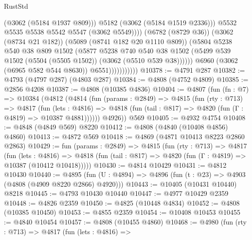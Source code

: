 \begin{lexlean}{RustStd}
\begin{coremodule}
                                      (@3062 (@5184 @1937 @809)))
                                    @5182
                                    (@3062 (@5184 @1519 @2336)))
                                  @5532
                                  @5535
                                  @5538
                                  @5542
                                  @5547
                                  (@3062 @5549))))
                            (@6782 (@8729 @36))
                            (@3062 (@8734 @21 @182))
                            (@5089 (@8741 @182 @20 @1110 @809))
                            (@5804
                              @5238
                              @540
                              @38
                              @809
                              @1502
                              (@5877
                                @5238
                                @740
                                @540
                                @38
                                @1502
                                (@5499 @539 @1502 (@5504 (@5505 @1502)) (@3062 (@5510 @539 @38))))))
                          @6960
                          (@3062 (@6965 @582 @544 @8630))
                          @6551)))))))))))
@10378 := @4791 @287
@10382 := @4793 (@4797 @287) (@4803 @287)
@10384 := @4808 (@4752 @4809)
@10385 := @2856 @4208
@10387 := @4808 (@10385 @4836)
@10404 := @4807
    (fun (fn : @7) =>
    @10384
      (@4812
        (@4814
          (fun (params : @2849) =>
          @4815
            (fun (rty : @713) =>
            @4817
              (fun (lets : @4816) =>
              @4818 (fun (tail : @817) => @4820 (fun (Γ : @4819) => @10387 @4881))))))
        @4926))
    @569
@10405 := @4932 @4754
@10408 := @4848 (@4849 @569) @8220
@10412 := @4808 (@4840 (@10408 @4856) @4860)
@10413 := @4872 @569
@10418 := @4869 (@4871 @10413 @8223 @2860 @2863)
@10429 := fun (params : @2849) =>
  @4815
    (fun (rty : @713) =>
    @4817
      (fun (lets : @4816) =>
      @4818 (fun (tail : @817) => @4820 (fun (Γ : @4819) => @10387 (@10412 @10418)))))
@10430 := @4814 @10429
@10431 := @4812 @10430
@10440 := @4895
    (fun (U : @4894) => @4896 (fun (t : @23) => @4903 (@4808 (@4909 @8220 @2866) @4920)))
@10443 := @10405 (@10431 @10440) @8218
@10445 := @4793 @10430 @10440
@10447 := @4977 @10429 @2359
@10448 := @4826 @2359
@10450 := @4825 (@10448 @4834)
@10452 := @4808 (@10385 @10450)
@10453 := @4855 @2359
@10454 := @10408 @10453
@10455 := @4840 @10454
@10457 := @4808 (@10455 @4860)
@10468 := @4980
    (fun (rty : @713) =>
    @4817
      (fun (lets : @4816) =>

\end{coremodule}
\end{lexlean}
